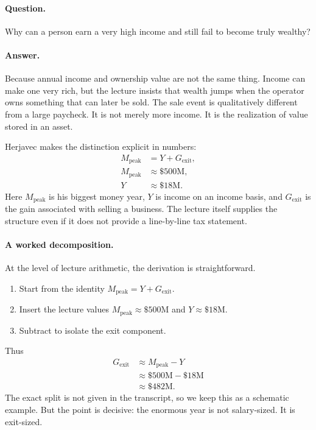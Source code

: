 \paragraph{Question.} Why can a person earn a very high income and still fail to become truly wealthy?

\paragraph{Answer.} Because annual income and ownership value are not the same thing. Income can make one very rich, but the lecture insists that wealth jumps when the operator owns something that can later be sold. The sale event is qualitatively different from a large paycheck. It is not merely more income. It is the realization of value stored in an asset.

Herjavec makes the distinction explicit in numbers:
\begin{align}
M_{\mathrm{peak}} &= Y + G_{\mathrm{exit}},\\
M_{\mathrm{peak}} &\approx \$500\text{M},\\
Y &\approx \$18\text{M}.
\end{align}
Here \(M_{\mathrm{peak}}\) is his biggest money year, \(Y\) is income on an income basis, and \(G_{\mathrm{exit}}\) is the gain associated with selling a business. The lecture itself supplies the structure even if it does not provide a line-by-line tax statement.

\paragraph{A worked decomposition.} At the level of lecture arithmetic, the derivation is straightforward.
\begin{enumerate}
\item Start from the identity \(M_{\mathrm{peak}} = Y + G_{\mathrm{exit}}\).
\item Insert the lecture values \(M_{\mathrm{peak}} \approx \$500\text{M}\) and \(Y \approx \$18\text{M}\).
\item Subtract to isolate the exit component.
\end{enumerate}
Thus
\begin{align}
G_{\mathrm{exit}}
&\approx M_{\mathrm{peak}} - Y \\
&\approx \$500\text{M} - \$18\text{M} \\
&\approx \$482\text{M}.
\end{align}
The exact split is not given in the transcript, so we keep this as a schematic example. But the point is decisive: the enormous year is not salary-sized. It is exit-sized.

